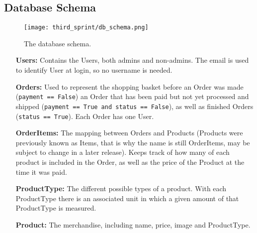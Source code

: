 \newpage

\subsection{Database Schema}

\begin{figure}[H]
  \centering
  \texttt{[image: third\_sprint/db\_schema.png]}
  \caption{\label{fig:schema} The database schema.}
\end{figure}

\begin{itemize}
  \item[\textbf{Users:}] Contains the Users, both admins and non-admins. The
    email is used to identify User at login, so no username is needed.
  \item[\textbf{Orders:}] Used to represent the shopping basket before an
    Order was made (\texttt{payment == False}) an Order that has
    been paid but not yet processed and shipped (\texttt{payment
    == True and status == False}), as well as finished Orders
    (\texttt{status == True}). Each Order has one User.
  \item[\textbf{OrderItems:}] The mapping between Orders and Products
    (Products were previously known as Items, that is why the name is still
    OrderItems, may be subject to change in a later release). Keeps track
    of how many of each product is included in the Order, as well as the
    price of the Product at the time it was paid.
  \item[\textbf{ProductType:}] The different possible types of a product. With
    each ProductType there is an associated unit in which a given amount
    of that ProductType is measured.
  \item[\textbf{Product:}] The merchandise, including name, price, image and
    ProductType.
\end{itemize}
